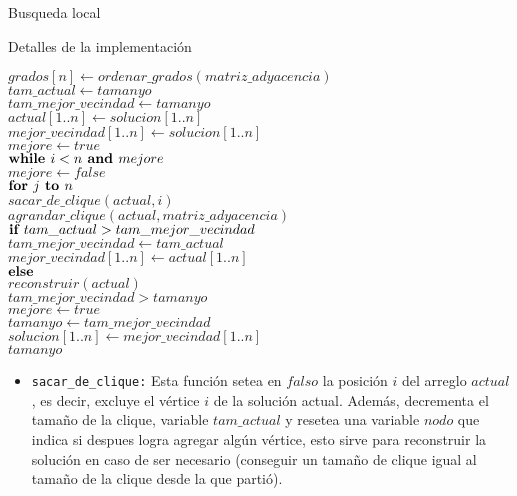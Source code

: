 \begin{section}{Busqueda local}
\begin{subsection}{Detalles de la implementación}
			\begin{pseudo}
				\tab $grados[n] \leftarrow ordenar\_grados(matriz\_adyacencia)$\\
				\tab $tam\_actual \leftarrow tamanyo$\\
				\tab $tam\_mejor\_vecindad \leftarrow tamanyo$\\
				\tab $actual[1..n] \leftarrow solucion[1..n]$\\
				\tab $mejor\_vecindad[1..n] \leftarrow solucion[1..n]$\\
				\tab $mejore \leftarrow true$\\
				\tab $\textbf{while } i<n \textbf{ and } mejore$\\
				\tab \tab \tab $mejore \leftarrow false$\\
				\tab \tab \tab $\textbf{for } j \textbf{ to } n$\\
				\tab \tab \tab \tab $sacar\_de\_clique(actual,i)$\\
				\tab \tab \tab \tab $agrandar\_clique(actual,matriz\_adyacencia)$\\
				\tab \tab \tab \tab$\textbf{if } tam\_actual>tam\_mejor\_vecindad$\\
				\tab \tab \tab \tab \tab $tam\_mejor\_vecindad \leftarrow tam\_actual$\\
				\tab \tab \tab \tab \tab $mejor\_vecindad[1..n] \leftarrow actual[1..n]$\\
				\tab \tab \tab \tab$\textbf{else }$\\
				\tab \tab \tab \tab \tab $reconstruir(actual)$\\
				\tab \tab \tab \IF $tam\_mejor\_vecindad>tamanyo$\\
				\tab \tab \tab \tab $mejore \leftarrow true$\\
				\tab \tab \tab \tab $tamanyo \leftarrow tam\_mejor\_vecindad$\\
				\tab \tab \tab \tab $solucion[1..n] \leftarrow mejor\_vecindad[1..n]$\\
				\RET $tamanyo$\\
			\end{pseudo}

		\begin{itemize}
			\item \texttt{sacar\_de\_clique:} Esta función setea en $falso$ la posición $i$ del arreglo $actual$, es decir, excluye el vértice $i$ de la solución actual. Además, decrementa el tamaño de la clique, variable $tam\_actual$ y resetea una variable $nodo$ que indica si despues logra agregar algún vértice, esto sirve para reconstruir la solución en caso de ser necesario (conseguir un tamaño de clique igual al tamaño de la clique desde la que partió).
			

\end{itemize}
\end{subsection}
\end{section}
